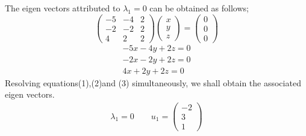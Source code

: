 \documentclass[12pt,a4paper]{article}
\begin{document}
\begin{itemize}
\begin{itemize}
The eigen vectors attributed to $\lambda_{1}=0 $ can be obtained as follows;\\

\[
\begin{pmatrix} -5 & -4 & 2 \\ -2 & -2 & 2\\4 &2 &2 \end{pmatrix} \begin{pmatrix} x \\ y \\z \end{pmatrix}=\begin{pmatrix} 0 \\ 0 \\0 \end{pmatrix}
\]
\begin{align}
-5x-4y+2z=0\\
-2x-2y+2z=0\\
4x+2y+2z=0
\end{align}
Resolving equations(1),(2)and (3) simultaneously, we shall obtain the associated eigen vectors.\\
\begin{align*}
\lambda_{1}=0\quad \quad u_{1}=
\begin{pmatrix} -2 \\ 3 \\1 \end{pmatrix}
\end{align*}


\end{itemize}
\end{itemize}
\end{document}
